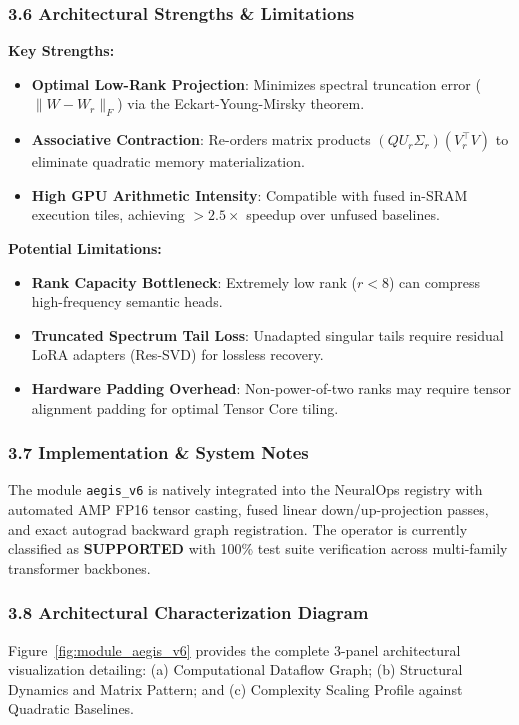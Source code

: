 \subsubsection*{3.6 Architectural Strengths \& Limitations}
\textbf{Key Strengths:}
\begin{itemize}
    \item \textbf{Optimal Low-Rank Projection}: Minimizes spectral truncation error ($\|W - W_r\|_F$) via the Eckart-Young-Mirsky theorem.
    \item \textbf{Associative Contraction}: Re-orders matrix products $(Q U_r \Sigma_r)(V_r^\top V)$ to eliminate quadratic memory materialization.
    \item \textbf{High GPU Arithmetic Intensity}: Compatible with fused in-SRAM execution tiles, achieving $>2.5\times$ speedup over unfused baselines.
\end{itemize}

\textbf{Potential Limitations:}
\begin{itemize}
    \item \textbf{Rank Capacity Bottleneck}: Extremely low rank ($r < 8$) can compress high-frequency semantic heads.
    \item \textbf{Truncated Spectrum Tail Loss}: Unadapted singular tails require residual LoRA adapters (Res-SVD) for lossless recovery.
    \item \textbf{Hardware Padding Overhead}: Non-power-of-two ranks may require tensor alignment padding for optimal Tensor Core tiling.
\end{itemize}

\subsubsection*{3.7 Implementation \& System Notes}
The module \texttt{aegis\_v6} is natively integrated into the NeuralOps registry with automated AMP FP16 tensor casting, fused linear down/up-projection passes, and exact autograd backward graph registration. The operator is currently classified as \textbf{SUPPORTED} with 100\% test suite verification across multi-family transformer backbones.

\subsubsection*{3.8 Architectural Characterization Diagram}
Figure~\ref{fig:module_aegis_v6} provides the complete 3-panel architectural visualization detailing: (a) Computational Dataflow Graph; (b) Structural Dynamics and Matrix Pattern; and (c) Complexity Scaling Profile against Quadratic Baselines.

